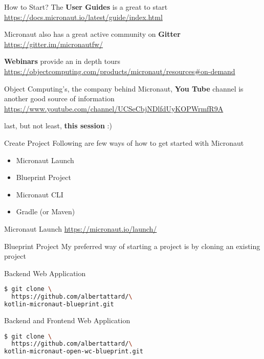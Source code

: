 \documentclass{beamer}
\begin{document}
  \begin{frame}[t]{How to Start?}
    The \textbf{User Guides} is a great to start
    \newline
    {\footnotesize \href{https://docs.micronaut.io/latest/guide/index.html}{https://docs.micronaut.io/latest/guide/index.html}}

    Micronaut also has a great active community on \textbf{Gitter}
    \newline
    {\footnotesize \href{https://gitter.im/micronautfw/}{https://gitter.im/micronautfw/}}

    \textbf{Webinars} provide an in depth tours
    \newline
    {\footnotesize \href{https://objectcomputing.com/products/micronaut/resources\#on-demand}{https://objectcomputing.com/products/micronaut/resources\#on-demand}}

    Object Computing's, the company behind Micronaut, \textbf{You Tube} channel is another good source of information
    \newline
    {\footnotesize \href{https://www.youtube.com/channel/UCSeCbjNDlfdUyKOPWrmfR9A}{https://www.youtube.com/channel/UCSeCbjNDlfdUyKOPWrmfR9A}}

    last, but not least, \textbf{this session} :)
  \end{frame}


  \begin{frame}[t]{Create Project}
    Following are few ways of how to get started with Micronaut

    \begin{itemize}
      \item Micronaut Launch
      \item Blueprint Project
      \item Micronaut CLI
      \item Gradle (or Maven)
    \end{itemize}
  \end{frame}


  \begin{frame}[t,fragile]{Micronaut Launch}
  \url{https://micronaut.io/launch/}
  \end{frame}


  \begin{frame}[t,fragile]{Blueprint Project}
    My preferred way of starting a project is by cloning an existing project

    Backend Web Application
    \begin{lstlisting}[language=bash, backgroundcolor = \color{green!5}]
$ git clone \
  https://github.com/albertattard/\
kotlin-micronaut-blueprint.git
    \end{lstlisting}

    Backend and Frontend Web Application
    \begin{lstlisting}[language=bash, backgroundcolor = \color{green!5}]
$ git clone \
  https://github.com/albertattard/\
kotlin-micronaut-open-wc-blueprint.git
\end{lstlisting}
\end{frame}
\end{document}
